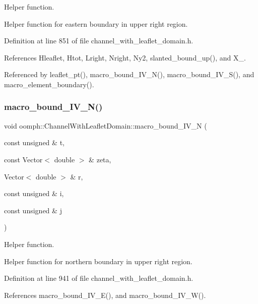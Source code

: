 Helper function. 

Helper function for eastern boundary in upper right region. 

Definition at line 851 of file channel\+\_\+with\+\_\+leaflet\+\_\+domain.\+h.



References Hleaflet, Htot, Lright, Nright, Ny2, slanted\+\_\+bound\+\_\+up(), and X\+\_.



Referenced by leaflet\+\_\+pt(), macro\+\_\+bound\+\_\+\+I\+V\+\_\+\+N(), macro\+\_\+bound\+\_\+\+I\+V\+\_\+\+S(), and macro\+\_\+element\+\_\+boundary().

\mbox{\label{classoomph_1_1ChannelWithLeafletDomain_ae8d9410d270e27677cb89c5dfe9cc136}} 
\subsubsection{\texorpdfstring{macro\+\_\+bound\+\_\+\+I\+V\+\_\+\+N()}{macro\_bound\_IV\_N()}}
{\footnotesize\ttfamily void oomph\+::\+Channel\+With\+Leaflet\+Domain\+::macro\+\_\+bound\+\_\+\+I\+V\+\_\+N (\begin{DoxyParamCaption}\item[{const unsigned \&}]{t,  }\item[{const Vector$<$ double $>$ \&}]{zeta,  }\item[{Vector$<$ double $>$ \&}]{r,  }\item[{const unsigned \&}]{i,  }\item[{const unsigned \&}]{j }\end{DoxyParamCaption})\hspace{0.3cm}{\ttfamily [protected]}}



Helper function. 

Helper function for northern boundary in upper right region. 

Definition at line 941 of file channel\+\_\+with\+\_\+leaflet\+\_\+domain.\+h.



References macro\+\_\+bound\+\_\+\+I\+V\+\_\+\+E(), and macro\+\_\+bound\+\_\+\+I\+V\+\_\+\+W().



